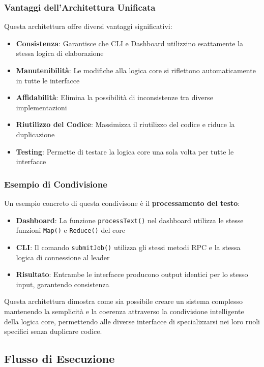 \documentclass[12pt,a4paper]{article}
\begin{document}
\subsubsection{Vantaggi dell'Architettura Unificata}

Questa architettura offre diversi vantaggi significativi:

\begin{itemize}
\item \textbf{Consistenza}: Garantisce che CLI e Dashboard utilizzino esattamente la stessa logica di elaborazione
\item \textbf{Manutenibilità}: Le modifiche alla logica core si riflettono automaticamente in tutte le interfacce
\item \textbf{Affidabilità}: Elimina la possibilità di inconsistenze tra diverse implementazioni
\item \textbf{Riutilizzo del Codice}: Massimizza il riutilizzo del codice e riduce la duplicazione
\item \textbf{Testing}: Permette di testare la logica core una sola volta per tutte le interfacce
\end{itemize}

\subsubsection{Esempio di Condivisione}

Un esempio concreto di questa condivisone è il \textbf{processamento del testo}:

\begin{itemize}
\item \textbf{Dashboard}: La funzione \texttt{processText()} nel dashboard utilizza le stesse funzioni \texttt{Map()} e \texttt{Reduce()} del core
\item \textbf{CLI}: Il comando \texttt{submitJob()} utilizza gli stessi metodi RPC e la stessa logica di connessione al leader
\item \textbf{Risultato}: Entrambe le interfacce producono output identici per lo stesso input, garantendo consistenza
\end{itemize}

Questa architettura dimostra come sia possibile creare un sistema complesso mantenendo la semplicità e la coerenza attraverso la condivisione intelligente della logica core, permettendo alle diverse interfacce di specializzarsi nei loro ruoli specifici senza duplicare codice.

\subsection{Flusso di Esecuzione}
\end{document}
